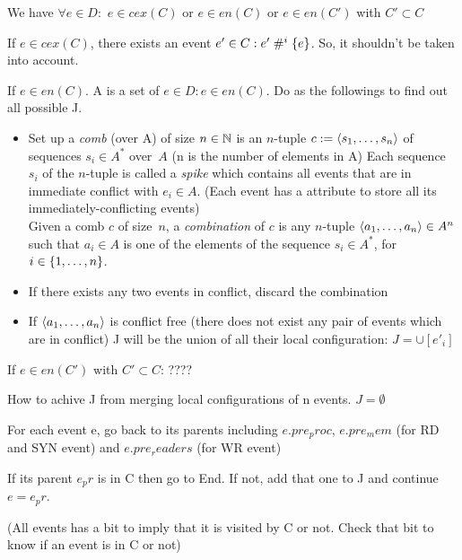 \documentclass{llncs}
\begin{document}
We have $\forall e \in D: $ $e \in cex(C)$ or $e \in en(C) $ or $e \in en(C')$ with $C'\subset C$

If  $e \in cex(C)$, there exists an event $e' \in C: e'\mathrel{\#^i_{}}\{e\}$. So, it shouldn't be taken into account.
 
If $e \in en(C)$. A is a set of $e \in D: e \in en(C)$. Do as the followings to find out all possible J.
\begin{itemize}
\item 
	Set up a \emph{comb} (over A) of size $n \in \mathbb{N}$  is an $n$-tuple
	$c \mathrel{:=} \langle s_1, \ldots, s_n\rangle$ of sequences $s_i \in A^*$
	over~$A$ (n is the number of elements in A)
	Each sequence $s_i$ of the $n$-tuple is called a \emph{spike} 
	which contains all events that are in immediate conflict with $e_{i} \in A$. (Each event has a attribute to store all its immediately-conflicting events) \\
	Given a comb $c$ of size~$n$,
	a \emph{combination} of $c$ is any $n$-tuple $\langle a_1, \ldots, a_n\rangle \in A^n$
	such that $a_i \in A$ is one of the elements of the sequence $s_i \in A^*$, for
	$i \in {\{ 1, \ldots, n \mathclose \}}$.
\item
	If there exists any two events in conflict, discard the combination
\item
	If $\langle a_1, \ldots, a_n\rangle$ is conflict free (there does not exist any pair of events which are in conflict)
	J will be the union of all their local configuration: $ J = \cup [e'_i]$
\end{itemize}

If $e \in en(C')$ with $C'\subset C$: ????

How to achive J from merging local configurations of n events.
$J = \emptyset$

For each event e, go back to its parents including $e.pre_proc$, $e.pre_mem$ (for RD and SYN event) and $e.pre_readers$ (for WR event)

If its parent $e_pr$ is in C then go to End. If not, add that one to J and continue $e = e_pr$.

(All events has a bit to imply that it is visited by C or not. Check that bit to know if an event is in C or not)
\end{document}
